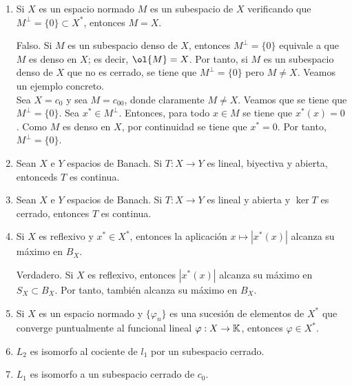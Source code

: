 \documentclass[12pt]{article}
\begin{document}
\begin{ejercicio}
\begin{enumerate}[label=(\alph*)]
            Por tanto, si $M$ es un subespacio cerrado propio de un espacio normado $X$, se tiene que:
            \begin{equation*}
                M = \ol{M} = \bigcap_{\substack{H \text{ hiperplano cerrado} \\ M \subset H}} H
            \end{equation*}

            Por tanto, la afirmación es cierta.
            \item Si $X$ es un espacio normado $M$ es un subespacio de $X$ verificando que $M^\perp = \{0\}\subset X^\ast$, entonces $M = X$.
            
            Falso. Si $M$ es un subespacio denso de $X$, entonces $M^\perp = \{0\}$ equivale a que $M$ es denso en $X$; es decir, $\ol{M} = X$. Por tanto, si $M$ es un subespacio denso de $X$ que no es cerrado, se tiene que $M^\perp = \{0\}$ pero $M \neq X$. Veamos un ejemplo concreto.\\

            Sea $X=c_0$ y sea $M = c_{00}$, donde claramente $M\neq X$. Veamos que se tiene que $M^\perp = \{0\}$. Sea $x^\ast \in M^\perp$. Entonces, para todo $x\in M$ se tiene que $x^\ast(x) = 0$. Como $M$ es denso en $X$, por continuidad se tiene que $x^\ast = 0$. Por tanto, $M^\perp = \{0\}$.
            \item Sean $X$ e $Y$ espacios de Banach. Si $T:X\to Y$ es lineal, biyectiva y abierta, entonceds $T$ es continua.
            \item Sean $X$ e $Y$ espacios de Banach. Si $T:X\to Y$ es lineal y abierta y $\ker T$ es cerrado, entonces $T$ es continua.
            \item Si $X$ es reflexivo y $x^\ast \in X^\ast$, entonces la aplicación $x\longmapsto |x^\ast(x)|$ alcanza su máximo en $B_X$.
            
            Verdadero. Si $X$ es reflexivo, entonces $|x^\ast(x)|$ alcanza su máximo en $S_X\subset B_X$. Por tanto, también alcanza su máximo en $B_X$.
            \item Si $X$ es un espacio normado y $\{\varphi_n\}$ es una sucesión de elementos de $X^\ast$ que converge puntualmente al funcional lineal $\varphi:X\to \mathbb{K}$, entonces $\varphi \in X^\ast$.
            \item $L_2$ es isomorfo al cociente de $l_1$ por un subespacio cerrado.
            \item $L_1$ es isomorfo a un subespacio cerrado de $c_0$.
            

\end{enumerate}
\end{ejercicio}
\end{document}
